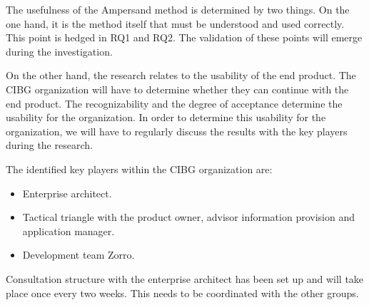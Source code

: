 The usefulness of the Ampersand method is determined by two things.
On the one hand, it is the method itself that must be understood and used correctly.
This point is hedged in RQ1 and RQ2.
The validation of these points will emerge during the investigation.

On the other hand, the research relates to the usability of the end product.
The CIBG organization will have to determine whether they can continue with the end product.
The recognizability and the degree of acceptance determine the usability for the organization.
In order to determine this usability for the organization, we will have to regularly discuss the results with the key players during the research.

The identified key players within the CIBG organization are:
\begin{itemize}
    \item Enterprise architect.
    \item Tactical triangle with the product owner, advisor information provision and application manager.
    \item Development team Zorro.
\end{itemize}

Consultation structure with the enterprise architect has been set up and will take place once every two weeks.
This needs to be coordinated with the other groups.